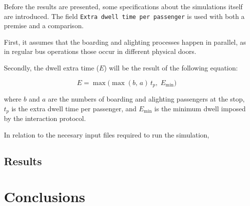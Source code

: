 \documentclass[a4paper,fleqn]{cas-sc}
\begin{document}
Before the results are presented, some specifications about the simulations itself are introduced.
The field \texttt{Extra dwell time per passenger} is used with both a premise and a comparison.

First, it assumes that the boarding and alighting processes happen in parallel, as in regular bus
operations those occur in different physical doors.

Secondly, the dwell extra time ($E$) will be the result of the following equation:

\begin{equation}\label{eq:dwell}
E = \max\bigl( \max(b,\, a)\, t_p,\; E_{\min} \bigr)
\end{equation}

\noindent where $b$ and $a$ are the numbers of boarding and alighting
passengers at the stop, $t_p$ is the extra dwell time per passenger, and
$E_{\min}$ is the minimum dwell imposed by the interaction protocol.

In relation to the necesary input files required to run the simulation, 


\subsection{Results}



\section{Conclusions}\label{}


\end{document}
